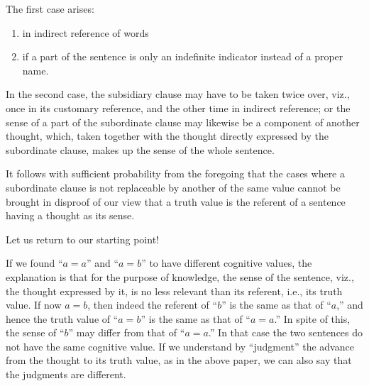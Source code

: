 \documentclass[twoside,12pt,a4paper]{article}
\begin{document}
The first case arises:
\begin{enumerate}[label={(\alph*)}]
\item in indirect reference of words
\item if a part of the sentence is only an indefinite indicator
  instead of a proper name.
\end{enumerate}

In the second case, the subsidiary clause may have to be taken twice
over, viz., once in its customary reference, and the other time in
indirect reference; or the sense of a part of the subordinate clause
may likewise be a component of another thought, which, taken together
with the thought directly expressed by the subordinate clause, makes
up the sense of the whole sentence.

It follows with sufficient probability from the foregoing that the
cases where a subordinate clause is not replaceable by another of the
same value cannot be brought in disproof of our view that a truth
value is the referent of a sentence having a thought as its sense.

Let us return to our starting point!

If we found ``$a=a$'' and ``$a=b$'' to have different cognitive
values, the explanation is that for the purpose of knowledge, the
sense of the sentence, viz., the thought expressed by it, is no less
relevant than its referent, i.e., its truth value. If now $a=b$, then
indeed the referent of ``$b$'' is the same as that of ``$a$,'' and
hence the truth value of ``$a=b$'' is the same as that of ``$a=a$.''
In spite of this, the sense of ``$b$'' may differ from that of
``$a=a$.'' In that case the two sentences do not have the same
cognitive value. If we understand by ``judgment'' the advance from
the thought to its truth value, as in the above paper, we can also say
that the judgments are different.
\end{document}
